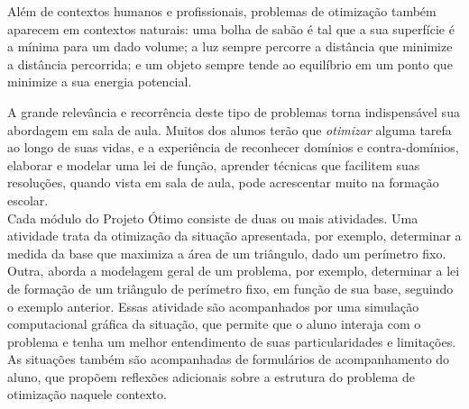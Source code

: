 Além de contextos humanos e profissionais, problemas de otimização também aparecem em contextos naturais: uma bolha de sabão é tal que a sua superfície é a mínima para um dado volume; a luz sempre percorre a distância que minimize a distância percorrida; e um objeto sempre tende ao equilíbrio em um ponto que minimize a sua energia potencial.

A grande relevância e recorrência deste tipo de problemas torna indispensável sua abordagem em sala de aula. Muitos dos alunos terão que \textit{otimizar} alguma tarefa ao longo de suas vidas, e a experiência de reconhecer domínios e contra-domínios, elaborar e modelar uma lei de função, aprender técnicas que facilitem suas resoluções, quando vista em sala de aula, pode acrescentar muito na formação escolar. 
\\

Cada módulo do Projeto Ótimo consiste de duas ou mais atividades. Uma atividade trata da otimização da situação apresentada, por exemplo, determinar a medida da base que maximiza a área de um triângulo, dado um perímetro fixo. Outra, aborda a modelagem geral de um problema, por exemplo, determinar a lei de formação de um triângulo de perímetro fixo, em função de sua base, seguindo o exemplo anterior. Essas atividade são acompanhados por uma simulação computacional gráfica da situação, que permite que o aluno interaja com o problema e tenha um melhor entendimento de suas particularidades e limitações. As situações também são acompanhadas de formulários de acompanhamento do aluno, que propõem reflexões adicionais sobre a estrutura do problema de otimização naquele contexto.


